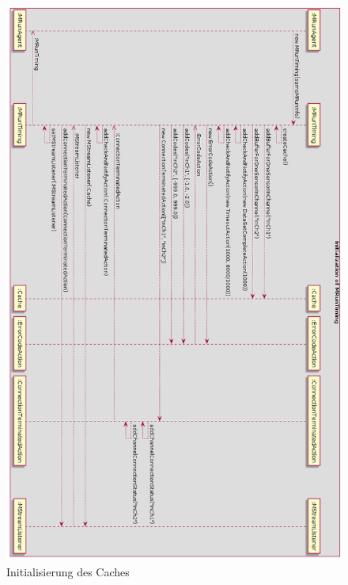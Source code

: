 \documentclass[parskip=full]{scrartcl}
\begin{document}
\begin{figure}[htbp]
	\begin{center}
		\includegraphics[width = 14cm]{Grafiken/4-MRunCacheInit_Rotated.png}
		\caption{Initialisierung des Caches}
		\label{MRunInitCache}
	\end{center}
\end{figure}
\end{document}
